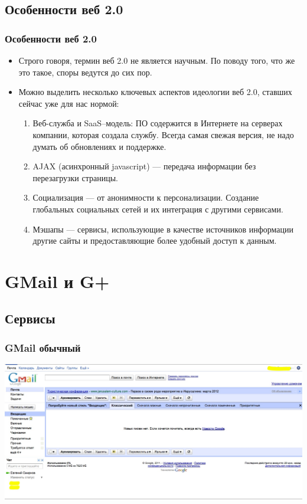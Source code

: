 \documentclass[compress,red]{beamer}
\begin{document}
\subsection{Особенности веб 2.0}
\begin{frame}
\frametitle{Особенности веб 2.0}
		\begin{itemize}
		\item Строго говоря, термин веб 2.0 не является научным. По поводу того, что же это такое, споры ведутся до сих пор.
		\item Можно выделить несколько ключевых аспектов идеологии веб 2.0, ставших сейчас уже для нас нормой:
		  \begin{enumerate}
		    \item Веб-служба и SaaS--модель: ПО содержится в Интернете на серверах компании, которая создала службу. Всегда самая свежая версия, не надо думать об обновлениях и поддержке.
		    \item AJAX (асинхронный javascript) --- передача информации без перезагрузки страницы.
		    \item Социализация --- от анонимности к персонализации. Создание глобальных социальных сетей и их интеграция с другими сервисами.
		    \item Мэшапы --- сервисы, использующие в качестве источников информации другие сайты и предоставляющие более удобный доступ к данным.
		  \end{enumerate}
		\end{itemize}
\end{frame}

\section{GMail и G+}
\subsection{Сервисы}
\begin{frame}
  \frametitle{GMail обычный}
	\centerline{\includegraphics[width=1.0\textwidth]{images/gmail-default.jpg}}
\end{frame}
\end{document}
